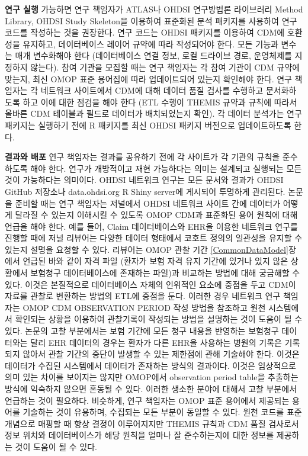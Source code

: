 \documentclass[10.5pt]{book}
\theoremstyle{definition}
\theoremstyle{definition}
\theoremstyle{definition}
\theoremstyle{remark}
\begin{document}
\textbf{연구 실행} 가능하면 연구 책임자가 ATLAS나 OHDSI 연구방법론
라이브러리 Method Library, OHDSI Study Skeleton을 이용하여 표준화된 분석
패키지를 사용하여 연구 코드를 작성하는 것을 권장한다. 연구 코드는 OHDSI
패키지를 이용하여 CDM에 호환성을 유지하고, 데이터베이스 레이어 규약에
따라 작성되어야 한다. 모든 기능과 변수는 매개 변수화해야 한다
(데이터베이스 연결 정보, 로컬 드라이브 경로, 운영체제를 지정하지
않는다). 참여 기관을 모집할 때는 연구 책임자는 각 참여 기관이 CDM 규약에
맞는지, 최신 OMOP 표준 용어집에 따라 업데이트되어 있는지 확인해야 한다.
연구 책임자는 각 네트워크 사이트에서 CDM에 대해 데이터 품질 검사를
수행하고 문서화하도록 하고 이에 대한 점검을 해야 한다 (ETL 수행이 THEMIS
규약과 규칙에 따라서 올바른 CDM 테이블과 필드로 데이터가 배치되었는지
확인). 각 데이터 분석가는 연구 패키지는 실행하기 전에 R 패키지를 최신
OHDSI 패키지 버전으로 업데이트하도록 한다.

\textbf{결과와 배포} 연구 책임자는 결과를 공유하기 전에 각 사이트가 각
기관의 규칙을 준수하도록 해야 한다. 연구가 개방적이고 재현 가능하다는
의미는 설계되고 실행되는 모든 것이 가능하다는 의미이다. OHDSI 네트워크
연구는 모든 문서와 결과가 OHDSI GitHub 저장소나 data.ohdsi.org R Shiny
server에 게시되어 투명하게 관리된다. 논문을 준비할 때는 연구 책임자는
저널에서 OHDSI 네트워크 사이트 간에 데이터가 어떻게 달라질 수 있는지
이해시킬 수 있도록 OMOP CDM과 표준화된 용어 원칙에 대해 언급을 해야
한다. 예를 들어, Claim 데이터베이스와 EHR을 이용한 네트워크 연구를
진행할 때에 저널 리뷰어는 다양한 데이터 형태에서 코호트 정의의 일관성을
유지할 수 있는지 설명을 요청할 수 있다. 리뷰어는 OMOP 관찰 기간
\ref{CommonDataModel}장에서 언급된 바와 같이 자격 파일 (환자가 보험 자격
유지 기간에 있거나 있지 않은 상황에서 보험청구 데이터베이스에 존재하는
파일)과 비교하는 방법에 대해 궁금해할 수 있다. 이것은 본질적으로
데이터베이스 자체의 인위적인 요소에 중점을 두고 CDM이 자료를 관찰로
변환하는 방법의 ETL에 중점을 둔다. 이러한 경우 네트워크 연구 책임자는
OMOP CDM OBSERVATION PERIOD 작성 방법을 참조하고 원천 시스템에서
확인되는 상황을 이용하여 관찰기록이 작성되는 방법을 설명하는 것이 도움이
될 수 있다. 논문의 고찰 부분에서는 보험 기간에 모든 청구 내용을 반영하는
보험청구 데이터와는 달리 EHR 데이터의 경우는 환자가 다른 EHR을 사용하는
병원의 기록은 기록되지 않아서 관찰 기간의 중단이 발생할 수 있는 제한점에
관해 기술해야 한다. 이것은 데이터가 수집된 시스템에서 데이터가 존재하는
방식의 결과이다. 이것은 임상적으로 의미 있는 차이를 보이지는 않지만
OMOP에서 observation period table을 추출하는 방식에 익숙하지 않으면
혼동될 수 있다. 이러한 생소한 분야에 대해서 고찰 부분에서 언급하는 것이
필요하다. 비슷하게, 연구 책임자는 OMOP 표준 용어에서 제공되는 용어를
기술하는 것이 유용하며, 수집되는 모든 부분이 동일할 수 있다. 원천 코드를
표준 개념으로 매핑할 때 항상 결정이 이루어지지만 THEMIS 규칙과 CDM 품질
검사로서 정보 위치와 데이터베이스가 해당 원칙을 얼마나 잘 준수하는지에
대한 정보를 제공하는 것이 도움이 될 수 있다.
\end{document}
